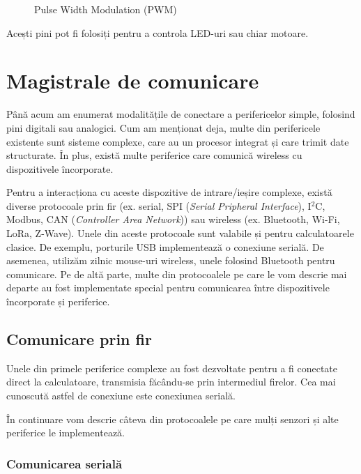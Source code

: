 \begin{figure}[htbp]
  \centering
  \def\svgwidth{\columnwidth}
  
  \caption{Pulse Width Modulation (PWM)}
  \label{fig:embed-pwm}
\end{figure}

Acești pini pot fi folosiți pentru a controla LED-uri sau chiar motoare.

\section{Magistrale de comunicare}
\label{sec:embed:bus}

Până acum am enumerat modalitățile de conectare a perifericelor simple, folosind
pini digitali sau analogici. Cum am menționat deja, multe din perifericele
existente sunt sisteme complexe, care au un procesor integrat și care trimit
date structurate. În plus, există multe periferice care comunică wireless cu
dispozitivele încorporate.

Pentru a interacționa cu aceste dispozitive de intrare/ieșire complexe, există
diverse protocoale prin fir (ex. serial, SPI (\textit{Serial Pripheral Interface}), I$^2$C, Modbus, CAN (\textit{Controller Area Network})) sau wireless
(ex. Bluetooth, Wi-Fi, LoRa, Z-Wave). Unele din aceste protocoale sunt valabile
și pentru calculatoarele clasice. De exemplu, porturile USB implementează o
conexiune serială. De asemenea, utilizăm zilnic mouse-uri wireless, unele
folosind Bluetooth pentru comunicare. Pe de altă parte, multe din protocoalele pe care
le vom descrie mai departe au fost implementate special pentru comunicarea între
dispozitivele încorporate și periferice.

\subsection{Comunicare prin fir}
\label{sec:embed:bus:wired}

Unele din primele periferice complexe au fost dezvoltate pentru a fi conectate
direct la calculatoare, transmisia făcându-se prin intermediul firelor. Cea mai
cunoscută astfel de conexiune este conexiunea serială.

În continuare vom descrie câteva din protocoalele pe care mulți senzori și alte
periferice le implementează.

\subsubsection{Comunicarea serială}
\label{sec:embed:bus:wired:serial}

